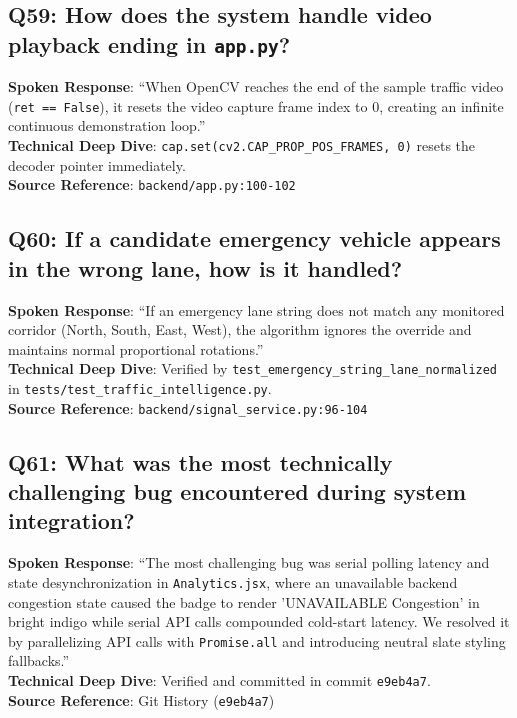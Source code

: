 \subsection*{Q59: How does the system handle video playback ending in \texttt{app.py}?}
\begin{interviewbox}
\textbf{Spoken Response}: ``When OpenCV reaches the end of the sample traffic video (\texttt{ret == False}), it resets the video capture frame index to 0, creating an infinite continuous demonstration loop.''\\
\textbf{Technical Deep Dive}: \texttt{cap.set(cv2.CAP\_PROP\_POS\_FRAMES, 0)} resets the decoder pointer immediately.\\
\textbf{Source Reference}: \texttt{backend/app.py:100-102}
\end{interviewbox}

\subsection*{Q60: If a candidate emergency vehicle appears in the wrong lane, how is it handled?}
\begin{interviewbox}
\textbf{Spoken Response}: ``If an emergency lane string does not match any monitored corridor (North, South, East, West), the algorithm ignores the override and maintains normal proportional rotations.''\\
\textbf{Technical Deep Dive}: Verified by \texttt{test\_emergency\_string\_lane\_normalized} in \texttt{tests/test\_traffic\_intelligence.py}.\\
\textbf{Source Reference}: \texttt{backend/signal\_service.py:96-104}
\end{interviewbox}

\subsection*{Q61: What was the most technically challenging bug encountered during system integration?}
\begin{interviewbox}
\textbf{Spoken Response}: ``The most challenging bug was serial polling latency and state desynchronization in \texttt{Analytics.jsx}, where an unavailable backend congestion state caused the badge to render 'UNAVAILABLE Congestion' in bright indigo while serial API calls compounded cold-start latency. We resolved it by parallelizing API calls with \texttt{Promise.all} and introducing neutral slate styling fallbacks.''\\
\textbf{Technical Deep Dive}: Verified and committed in commit \texttt{e9eb4a7}.\\
\textbf{Source Reference}: Git History (\texttt{e9eb4a7})
\end{interviewbox}

